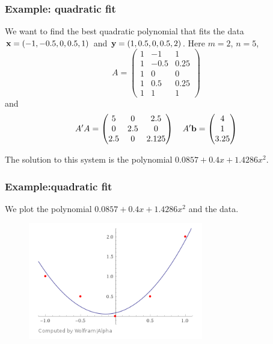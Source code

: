 \documentclass[11pt,aspectratio=169]{beamer}
\begin{document}
\begin{frame}
\frametitle{Example: quadratic fit }
\begin{small}
 We want to find the  best  quadratic polynomial that  fits  the data
${\bf x}=(-1, -0.5, 0, 0.5, 1)$ and ${\bf y}=(1, 0.5, 0, 0.5, 2)$.
\vskip 12pt
 Here $m=2$, $n=5$, 
\begin{equation*}
A=\begin{pmatrix}
1 & -1 & 1\\
1 & -0.5 & 0.25 \\
1 & 0 & 0 \\
1& 0.5 &0.25 \\
1& 1 & 1
\end{pmatrix} 
\end{equation*} 
and
\begin{equation*}
A'  A=\begin{pmatrix}
5 & 0 & 2.5\\
0 & 2.5 & 0 \\
2.5 & 0 & 2.125 
\end{pmatrix} \quad 
A' {\bf b}=\begin{pmatrix}
4\\
1 \\
3.25
\end{pmatrix} 
\end{equation*}

The solution to this system is the  polynomial  $0.0857+0.4x+1.4286 x^2$.


\end{small}
\end{frame}

\begin{frame}
\frametitle{Example:quadratic  fit}
\begin{small}We plot the polynomial $0.0857+0.4x+1.4286 x^2$ and the data.\end{small}
\begin{figure}
\includegraphics[width=3in]{img/least_squares2} 
\end{figure}
\end{frame}
\end{document}
